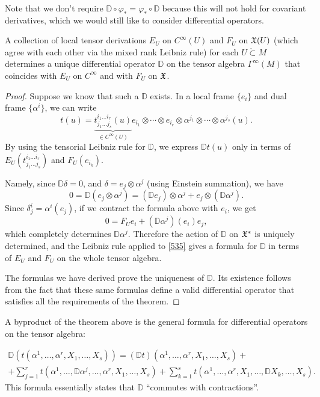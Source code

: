 Note that we don't require $\mathbb{D}\circ\varphi_\ast=\varphi_\ast\circ \mathbb{D}$ because this will not hold for covariant derivatives, which we would still like to consider differential operators.

\begin{thm}\label{Willmore}
A collection of local tensor derivations $E_U$ on $C^\infty(U)$ and $F_U$ on $\mathfrak{X}(U)$ (which agree with each other via the mixed rank Leibniz rule) for each $U\mathring{\subset}M$ determines a unique differential operator $\mathbb{D}$ on the tensor algebra $\Gamma^\infty(M)$ that coincides with $E_U$ on $C^\infty$ and with $F_U$ on $\mathfrak{X}$.
\end{thm}
\begin{proof}
    Suppose we know that such a $\mathbb{D}$ exists. In a local frame $\{e_i\}$ and dual frame $\{\alpha^i\}$, we can write
    \[t(u)=\underbrace{t_{j_1\ldots j_s}^{i_1\ldots i_r}(u)}_{\in C^\infty(U)} e_{i_1}\otimes \cdots \otimes e_{i_r}\otimes \alpha^{j_1}\otimes \cdots\otimes \alpha^{j_s}(u).\label{535}\]
    By using the tensorial Leibniz rule for $\mathbb{D}$, we express $\mathbb{D}t(u)$ only in terms of $E_U(t_{j_1\ldots j_s}^{i_1\ldots i_r})$ and $F_U(e_{i_k})$.
    
    Namely, since $\mathbb{D}\delta=0$, and $\delta=e_j\otimes \alpha^j$ (using Einstein summation), we have 
    \[0=\mathbb{D}(e_j\otimes \alpha^j)=(\mathbb{D}e_j)\otimes \alpha^j+e_j\otimes (\mathbb{D}\alpha^j).\]
    Since $\delta^i_j=\alpha^i(e_j)$, if we contract the formula above with $e_i$, we get
    \[0=F_U e_i+(\mathbb{D}\alpha^j)(e_i) e_j,\]
    which completely determines $\mathbb{D}\alpha^j$. Therefore the action of $\mathbb{D}$ on $\mathfrak{X}^\ast$ is uniquely determined, and the Leibniz rule applied to \ref{535} gives a formula for $\mathbb{D}$ in terms of $E_U$ and $F_U$ on the whole tensor algebra.
    
    The formulas we have derived prove the uniqueness of $\mathbb{D}$. Its existence follows from the fact that these same formulas define a valid differential operator that satisfies all the requirements of the theorem.
\end{proof}
\begin{cor}\label{cor willmore formula}
A byproduct of the theorem above is the general formula for differential operators on the tensor algebra:

\begin{multline}
    \mathbb{D}\left(t(\alpha^1,\ldots,\alpha^r,X_1,\ldots,X_s)\right)=(\mathbb{D}t)(\alpha^1,\ldots,\alpha^r,X_1,\ldots,X_s)+\\+\sum_{j=1}^r t\left(\alpha^1,\ldots,\mathbb{D}\alpha^j,\ldots,\alpha^r,X_1,\ldots,X_s\right)+\sum_{k=1}^s t\left(\alpha^1,\ldots,\alpha^r,X_1,\ldots,\mathbb{D}X_k,\ldots,X_s\right).
\end{multline}
This formula essentially states that $\mathbb{D}$ ``commutes with contractions''.
\end{cor}

